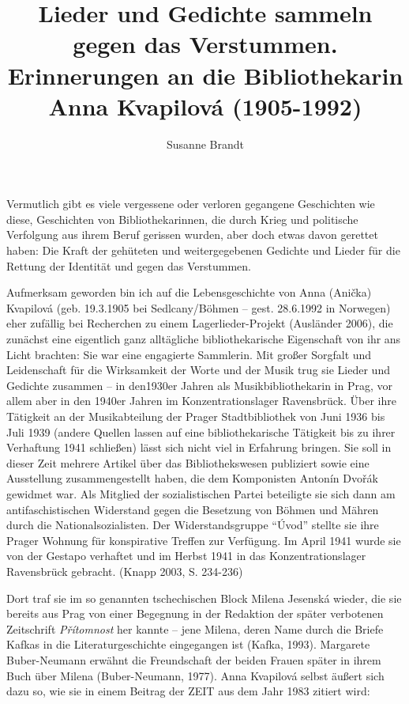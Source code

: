 \documentclass[a4paper,
fontsize=11pt,
oneside,
numbers=noperiodatend,
parskip=half-,
bibliography=totoc,
final
]{scrartcl}
\title{\LARGE{Lieder und Gedichte sammeln gegen das Verstummen. Erinnerungen an die Bibliothekarin Anna Kvapilová (1905-1992)}} %
\author{Susanne Brandt} %
\date{}
\begin{document}
\maketitle
\thispagestyle{fancyplain} 


Vermutlich gibt es viele vergessene oder verloren gegangene Geschichten
wie diese, Geschichten von Bibliothekarinnen, die durch Krieg und
politische Verfolgung aus ihrem Beruf gerissen wurden, aber doch etwas
davon gerettet haben: Die Kraft der gehüteten und weitergegebenen
Gedichte und Lieder für die Rettung der Identität und gegen das
Verstummen.

Aufmerksam geworden bin ich auf die Lebensgeschichte von Anna (Anička)
Kvapilová (geb. 19.3.1905 bei Sedlcany/Böhmen -- gest. 28.6.1992 in
Norwegen) eher zufällig bei Recherchen zu einem Lagerlieder-Projekt
(Ausländer 2006), die zunächst eine eigentlich ganz alltägliche
bibliothekarische Eigenschaft von ihr ans Licht brachten: Sie war eine
engagierte Sammlerin. Mit großer Sorgfalt und Leidenschaft für die
Wirksamkeit der Worte und der Musik trug sie Lieder und Gedichte
zusammen -- in den1930er Jahren als Musikbibliothekarin in Prag, vor
allem aber in den 1940er Jahren im Konzentrationslager Ravensbrück. Über
ihre Tätigkeit an der Musikabteilung der Prager Stadtbibliothek von Juni
1936 bis Juli 1939 (andere Quellen lassen auf eine bibliothekarische
Tätigkeit bis zu ihrer Verhaftung 1941 schließen) lässt sich nicht viel
in Erfahrung bringen. Sie soll in dieser Zeit mehrere Artikel über das
Bibliothekswesen publiziert sowie eine Ausstellung zusammengestellt
haben, die dem Komponisten Antonín Dvořák gewidmet war. Als Mitglied der
sozialistischen Partei beteiligte sie sich dann am antifaschistischen
Widerstand gegen die Besetzung von Böhmen und Mähren durch die
Nationalsozialisten. Der Widerstandsgruppe \enquote{Úvod} stellte sie
ihre Prager Wohnung für konspirative Treffen zur Verfügung. Im April
1941 wurde sie von der Gestapo verhaftet und im Herbst 1941 in das
Konzentrationslager Ravensbrück gebracht. (Knapp 2003, S. 234-236)

Dort traf sie im so genannten tschechischen Block Milena Jesenská
wieder, die sie bereits aus Prag von einer Begegnung in der Redaktion
der später verbotenen Zeitschrift \emph{Přítomnost} her kannte -- jene
Milena, deren Name durch die Briefe Kafkas in die Literaturgeschichte
eingegangen ist (Kafka, 1993). Margarete Buber-Neumann erwähnt die
Freundschaft der beiden Frauen später in ihrem Buch über Milena
(Buber-Neumann, 1977). Anna Kvapilová selbst äußert sich dazu so, wie
sie in einem Beitrag der ZEIT aus dem Jahr 1983 zitiert wird:
\end{document}
